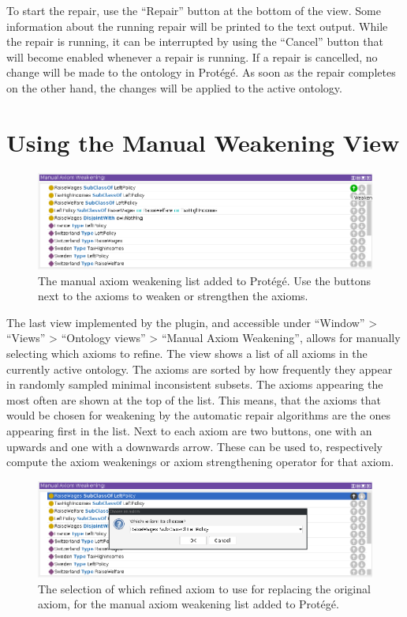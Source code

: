 To start the repair, use the ``Repair'' button at the bottom of the view. Some information about the running repair will be printed to the text output. While the repair is running, it can be interrupted by using the ``Cancel'' button that will become enabled whenever a repair is running. If a repair is cancelled, no change will be made to the ontology in Protégé. As soon as the repair completes on the other hand, the changes will be applied to the active ontology.

\section{Using the Manual Weakening View}

\begin{figure}[htbp]
  \centering
  \includegraphics[width=\textwidth]{resources/protege-guide-list.png}
  \caption{The manual axiom weakening list added to Protégé. Use the buttons next to the axioms to weaken or strengthen the axioms.}
\end{figure}

The last view implemented by the plugin, and accessible under ``Window'' > ``Views'' > ``Ontology views'' > ``Manual Axiom Weakening'', allows for manually selecting which axioms to refine. The view shows a list of all axioms in the currently active ontology. The axioms are sorted by how frequently they appear in randomly sampled minimal inconsistent subsets. The axioms appearing the most often are shown at the top of the list. This means, that the axioms that would be chosen for weakening by the automatic repair algorithms are the ones appearing first in the list. Next to each axiom are two buttons, one with an upwards and one with a downwards arrow. These can be used to, respectively compute the axiom weakenings or axiom strengthening operator for that axiom.

\begin{figure}[htbp]
  \centering
  \includegraphics[width=\textwidth]{resources/protege-guide-replace.png}
  \caption{The selection of which refined axiom to use for replacing the original axiom, for the manual axiom weakening list added to Protégé.}
\end{figure}

